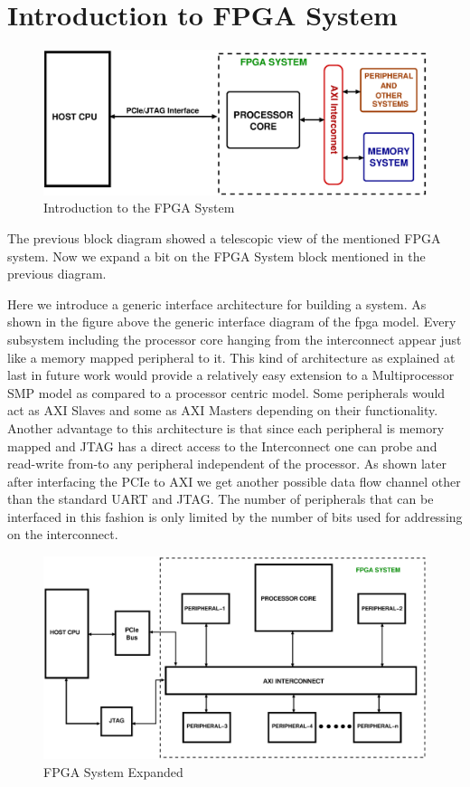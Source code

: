 \chapter{Introduction to FPGA System}

\begin{figure}[H]
\centering
\includegraphics[width=\textwidth]{eps_pdf_sources/ajit_fpga/System_overview/fpga_system_intro}
\caption{Introduction to the FPGA System}
\end{figure}

The previous block diagram showed a telescopic view of the mentioned FPGA system. Now we expand a bit on the FPGA System block mentioned in
the previous diagram.

Here we introduce a generic interface architecture for building a system. As shown in the figure above the generic interface diagram of the
fpga model. Every subsystem including the processor core hanging from the interconnect appear just like a memory mapped peripheral to it.
This kind of architecture as explained at last in future work would provide a relatively easy extension to a Multiprocessor SMP model as
compared to a processor centric model. Some peripherals would act as AXI Slaves and some as AXI Masters depending on their functionality.
Another advantage to this architecture is that since each peripheral is memory mapped and JTAG has a direct access to the Interconnect one
can probe and read-write from-to any peripheral independent of the processor. As shown later after interfacing the PCIe to AXI we get
another possible data flow channel other than the standard UART and JTAG.  The number of peripherals that can be interfaced in this fashion
is only limited by the number of bits used for addressing on the interconnect.

\begin{figure}[H]
\centering
\includegraphics[width=\textwidth]{eps_pdf_sources/ajit_fpga/System_overview/fpga_system_expanded}
\caption{FPGA System Expanded}
\end{figure}
